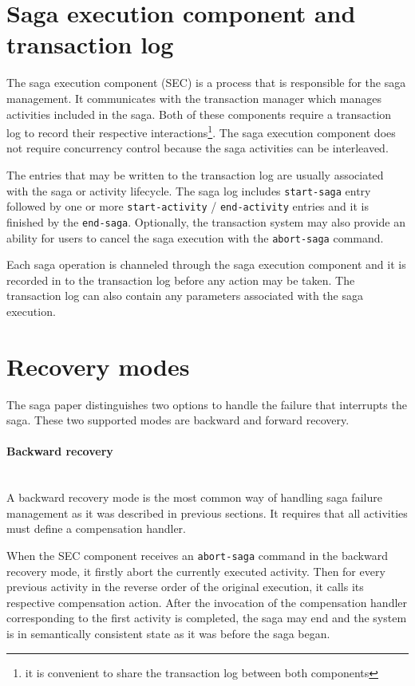 \documentclass[oneside,
  digital, %
  table,   %
  nolof,     %
  nolot,     %
]{fithesis3}
\newcommand{\newlinepar}[1]{\paragraph{#1}\needspace{4\baselineskip}\mbox{}\\}
\begin{document}
\section{Saga execution component and transaction log}

The saga execution component (SEC) is a process that is responsible for the saga management. It communicates with the transaction manager which manages activities included in the saga. Both of these components require a transaction log to record their respective interactions\footnote{it is convenient to share the transaction log between both components}. The saga execution component does not require  concurrency control because the saga activities can be interleaved.

The entries that may be written to the transaction log are usually associated with the saga or activity lifecycle. The saga log includes \texttt{start-saga} entry followed by one or more \texttt{start-activity} / \texttt{end-activity} entries and it is finished by the \texttt{end-saga}. Optionally, the transaction system may also provide an ability for users to cancel the saga execution with the \texttt{abort-saga} command. 

Each saga operation is channeled through the saga execution component and it is recorded in to the transaction log before any action may be taken. The transaction log can also contain any parameters associated with the saga execution.

\section{Recovery modes}
\label{sec:recovery-modes}

The saga paper \cite{sagas_publ} distinguishes two options to handle the failure that interrupts the saga. These two supported modes are backward and forward recovery.

\newlinepar{Backward recovery}

A backward recovery mode is the most common way of handling saga failure management as it was described in previous sections. It requires that all activities must define a compensation handler.

When the SEC component receives an \texttt{abort-saga} command in the backward recovery mode, it firstly abort the currently executed activity. Then for every previous activity in the reverse order of the original execution, it calls its respective compensation action. After the invocation of the compensation handler corresponding to the first activity is completed, the saga may end and the system is in semantically consistent state as it was before the saga began.
\end{document}
